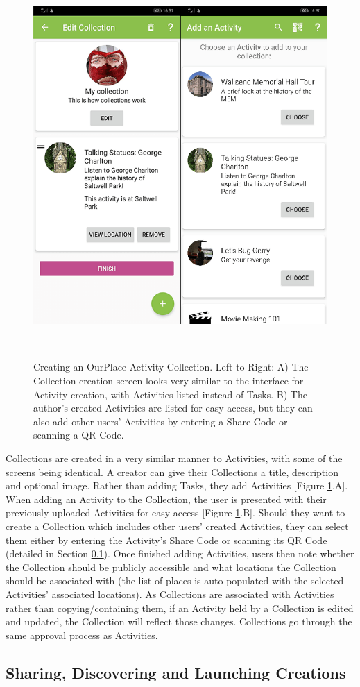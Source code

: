 \begin{figure}
  \centering
  \includegraphics[width=0.5\columnwidth]{images/chapter05/CreateCollection.png}
  \caption[Creating an OurPlace Activity Collection]{Creating an OurPlace Activity Collection. Left to Right: A) The Collection creation screen looks very similar to the interface for Activity creation, with Activities listed instead of Tasks. B) The author's created Activities are listed for easy access, but they can also add other users' Activities by entering a Share Code or scanning a QR Code. }~\label{fig:CollectionCreation}
\end{figure}

Collections are created in a very similar manner to Activities, with some of the screens being identical. A creator can give their Collections a title, description and optional image. Rather than adding Tasks, they add Activities [Figure \ref{fig:CollectionCreation}.A]. When adding an Activity to the Collection, the user is presented with their previously uploaded Activities for easy access [Figure \ref{fig:CollectionCreation}.B]. Should they want to create a Collection which includes other users' created Activities, they can select them either by entering the Activity's Share Code or scanning its QR Code (detailed in Section \ref{sec:SharingActivities}). Once finished adding Activities, users then note whether the Collection should be publicly accessible and what locations the Collection should be associated with (the list of places is auto-populated with the selected Activities' associated locations). As Collections are associated with Activities rather than copying/containing them, if an Activity held by a Collection is edited and updated, the Collection will reflect those changes. Collections go through the same approval process as Activities.

\subsection{Sharing, Discovering and Launching Creations}
\label{sec:SharingActivities}

